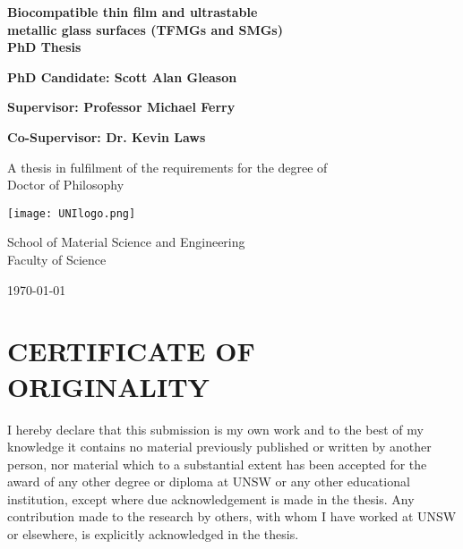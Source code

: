 \documentclass[a4paper,12pt,oneside]{report}%
\begin{document}
\thispagestyle{empty} %
\begin{titlepage}
\begin{center}
\vspace*{1cm}
	
\textbf{\LARGE{Biocompatible thin film and ultrastable\\metallic glass surfaces (TFMGs and SMGs)}}\\
\textbf{PhD Thesis}

\vspace{2cm}

\textbf{\large{PhD Candidate: Scott Alan Gleason}}

\textbf{Supervisor: Professor Michael Ferry}

\textbf{Co-Supervisor: Dr. Kevin Laws}

\vspace{2cm}

A thesis in fulfilment of the requirements for the degree of \\
Doctor of Philosophy

\vspace{1.1cm}

\texttt{[image: UNIlogo.png]}
\label{fig:Unilogo}

\vspace{0.8cm}

School of Material Science and Engineering\\ Faculty of Science

\vspace{2cm}

\today
\end{center}
\end{titlepage}

\clearpage 
{}

\chapter*{CERTIFICATE OF ORIGINALITY}

I hereby declare that this submission is my own work and to the best of my knowledge it
contains no material previously published or written by another person, nor material which
to a substantial extent has been accepted for the award of any other degree or diploma
at UNSW or any other educational institution, except where due acknowledgement is
made in the thesis. Any contribution made to the research by others, with whom I have
worked at UNSW or elsewhere, is explicitly acknowledged in the thesis.
\end{document}
